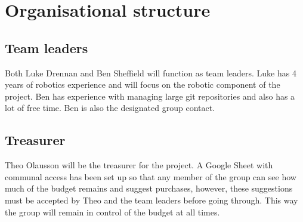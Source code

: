 \documentclass[onecolumn]{IEEEtran}
\begin{document}
\section{Organisational structure}

\subsection{Team leaders}

Both Luke Drennan and Ben Sheffield will function as team leaders. Luke has 4 years of robotics experience and will focus on the robotic component of the project. Ben has experience with managing large git repositories and also has a lot of free time. Ben is also the designated group contact.

\subsection{Treasurer}

Theo Olausson will be the treasurer for the project. A Google Sheet with communal access has been set up so that any member of the group can see how much of the budget remains and suggest purchases, however, these suggestions must be accepted by Theo and the team leaders before going through. This way the group will remain in control of the budget at all times.
\end{document}
